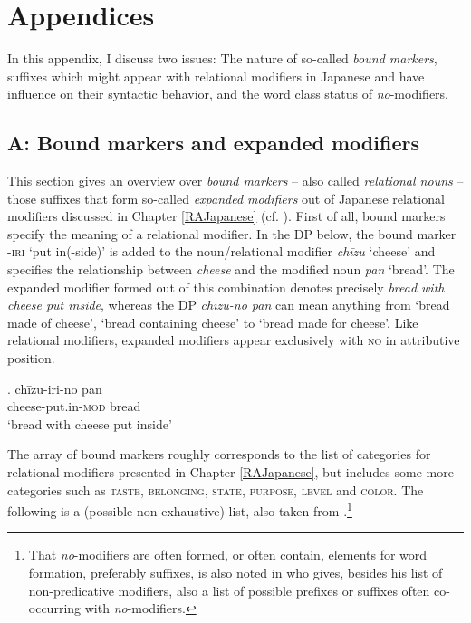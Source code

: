 \documentclass [output=book,colorlinks,citecolor=brown]{langscibook}
\begin{document}
\chapter*{Appendices} \label{appendix}

In this appendix, I discuss two issues: The nature of so-called \textit{bound markers}, suffixes which might appear with relational modifiers in Japanese and have influence on their syntactic behavior, and the word class status of \textit{no}-modifiers.

\section*{A: Bound markers and expanded modifiers}

This section gives an overview over \textit{bound markers} -- also called \textit{relational nouns} -- those suffixes that form so-called \textit{expanded modifiers} out of Japanese relational modifiers discussed in Chapter \ref{RAJapanese} (cf. \citealt{nagano:2016:are, shimada:2018:relational}). First of all, bound markers specify the meaning of a relational modifier. In the DP below, the bound marker -\textsc{iri} `put in(-side)’ is added to the noun/relational modifier \textit{chīzu} `cheese’ and specifies the relationship between \textit{cheese} and the modified noun \textit{pan} `bread’. The expanded modifier formed out of this combination denotes precisely \textit{bread with cheese put inside}, whereas the DP \textit{chīzu-no pan} can mean anything from `bread made of cheese', `bread containing cheese' to `bread made for cheese’. Like relational modifiers, expanded modifiers appear exclusively with \textsc{no} in attributive position. %

\setcounter{ExNo}{0}

\exg. chīzu-iri-no pan\\
cheese-put.in-\textsc{mod} bread\\
`bread with cheese put inside' \label{chizuiri}

The array of bound markers roughly corresponds to the list of categories for relational modifiers presented in Chapter \ref{RAJapanese}, but includes some more categories such as \textsc{taste}, \textsc{belonging}, \textsc{state}, \textsc{purpose}, \textsc{level} and \textsc{color}. The following is a (possible non-exhaustive) list, also taken from \citet[56–57]{nagano:2016:are}.\footnote{That \textit{no}-modifiers are often formed, or often contain, elements for word formation, preferably suffixes, is also noted in \citet[195–205]{muraki:2012:nihongo} who gives, besides his list of non-predicative modifiers, also a list of possible prefixes or suffixes often co-occurring with \textit{no}-modifiers.} %
\end{document}
